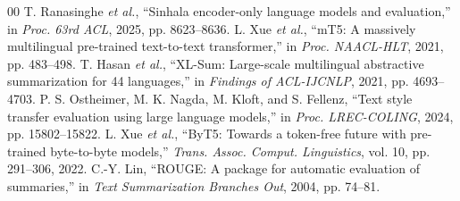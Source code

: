 \documentclass[a4paper,conference]{IEEEtran}
\begin{document}
\begin{thebibliography}{00}
 T. Ranasinghe \textit{et al.}, ``Sinhala encoder-only language models and evaluation,'' in \textit{Proc. 63rd ACL}, 2025, pp. 8623--8636.
 L. Xue \textit{et al.}, ``mT5: A massively multilingual pre-trained text-to-text transformer,'' in \textit{Proc. NAACL-HLT}, 2021, pp. 483--498.
 T. Hasan \textit{et al.}, ``XL-Sum: Large-scale multilingual abstractive summarization for 44 languages,'' in \textit{Findings of ACL-IJCNLP}, 2021, pp. 4693--4703.
 P. S. Ostheimer, M. K. Nagda, M. Kloft, and S. Fellenz, ``Text style transfer evaluation using large language models,'' in \textit{Proc. LREC-COLING}, 2024, pp. 15802--15822.
 L. Xue \textit{et al.}, ``ByT5: Towards a token-free future with pre-trained byte-to-byte models,'' \textit{Trans. Assoc. Comput. Linguistics}, vol. 10, pp. 291--306, 2022.
 C.-Y. Lin, ``ROUGE: A package for automatic evaluation of summaries,'' in \textit{Text Summarization Branches Out}, 2004, pp. 74--81.
\end{thebibliography}
\end{document}
